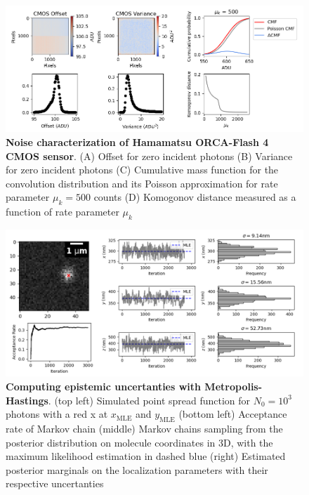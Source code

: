 \documentclass{ucetd}
\begin{document}
\begin{figure}
\begin{center}
\includegraphics[width=16cm]{Noise.png}
\end{center}
\caption{\textbf{Noise characterization of Hamamatsu ORCA-Flash 4 CMOS sensor}. (A) Offset for zero incident photons (B) Variance for zero incident photons (C) Cumulative mass function for the convolution distribution and its Poisson approximation for rate parameter $\mu_{k} = 500$ counts (D) Komogonov distance measured as a function of rate parameter $\mu_{k}$}
\end{figure}

\begin{figure}
\begin{center}
\includegraphics[width=16cm]{MCMC.png}
\end{center}
\caption{\textbf{Computing epistemic uncertanties with Metropolis-Hastings}. (top left) Simulated point spread function for $N_{0}=10^{3}$ photons with a red x at $x_{\mathrm{MLE}}$ and $y_{\mathrm{MLE}}$ (bottom left) Acceptance rate of Markov chain (middle) Markov chains sampling from the posterior distribution on molecule coordinates in 3D, with the maximum likelihood estimation in dashed blue (right) Estimated posterior marginals on the localization parameters with their respective uncertanties}
\end{figure}
\end{document}
